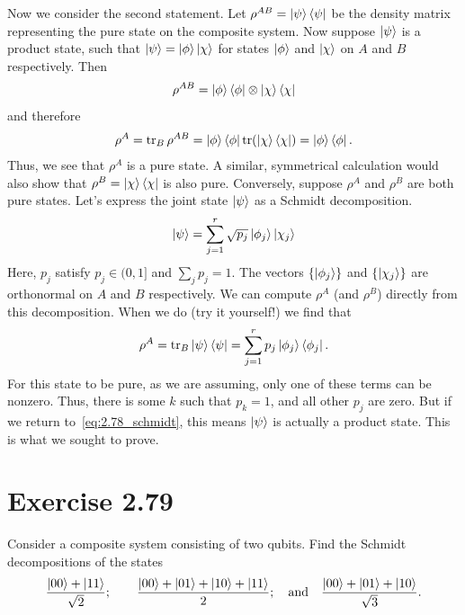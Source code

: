 \documentclass{book}
\begin{document}
    Now we consider the second statement. Let $\rho^{AB} = \ket{\psi}\bra{\psi}$ be the density matrix representing the pure state on the composite system. Now suppose $\ket{\psi}$ is a product state, such that $\ket{\psi} = \ket{\phi}\ket{\chi}$ for states $\ket{\phi}$ and $\ket{\chi}$ on $A$ and $B$ respectively. Then
    \begin{align}
        \rho^{AB} = \ket{\phi}\bra{\phi} \otimes \ket{\chi}\bra{\chi}
    \end{align}
    and therefore
    \begin{align}
        \rho^A = \tr_B \rho^{AB} = \ket{\phi}\bra{\phi} \tr(\ket{\chi}\bra{\chi}) = \ket{\phi}\bra{\phi}.
    \end{align}
    Thus, we see that $\rho^A$ is a pure state. A similar, symmetrical calculation would also show that $\rho^B = \ket{\chi}\bra{\chi}$ is also pure. Conversely, suppose $\rho^A$ and $\rho^B$ are both pure states. Let's express the joint state $\ket{\psi}$ as a Schmidt decomposition.
    \begin{align} \label{eq:2.78_schmidt}
        \ket{\psi} = \sum_{j=1}^r \sqrt{p_j} \ket{\phi_j}\ket{\chi_j}
    \end{align}
    Here, $p_j$ satisfy $p_j \in (0,1]$ and $\sum_j p_j = 1$. The vectors $\{\ket{\phi_j}\}$ and $\{\ket{\chi_j}\}$ are orthonormal on $A$ and $B$ respectively. We can compute $\rho^A$ (and $\rho^B$) directly from this decomposition. When we do (try it yourself!) we find that
    \begin{align}
        \rho^A = \tr_B \ket{\psi}\bra{\psi} = \sum_{j=1}^r p_j \ket{\phi_j}\bra{\phi_j}.
    \end{align}
    For this state to be pure, as we are assuming, only one of these terms can be nonzero. Thus, there is some $k$ such that $p_k = 1$, and all other $p_j$ are zero. But if we return to~\eqref{eq:2.78_schmidt}, this means $\ket{\psi}$ is actually a product state. This is what we sought to prove.

\section*{Exercise 2.79}
    Consider a composite system consisting of two qubits. Find the Schmidt decompositions of the states
    \begin{align}
        \frac{\ket{00} + \ket{11}}{\sqrt{2}}; \qquad \frac{\ket{00} + \ket{01} + \ket{10} + \ket{11}}{2}; \quad \text{and} \quad \frac{\ket{00} + \ket{01} + \ket{10}}{\sqrt{3}}.
    \end{align}
\end{document}
